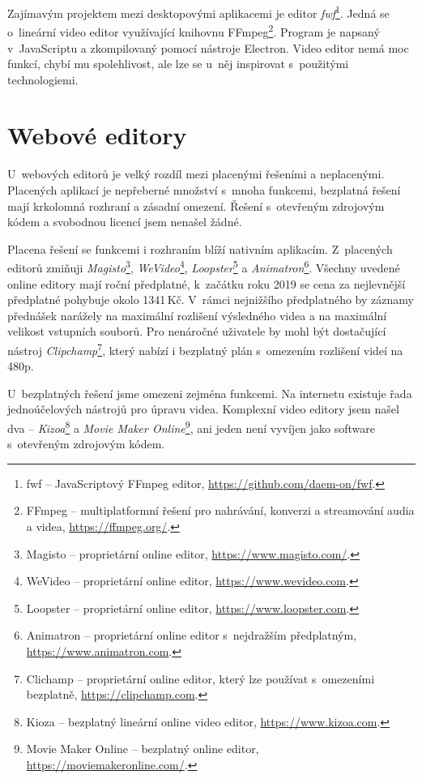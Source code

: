 Zajímavým projektem mezi desktopovými aplikacemi je editor \textit{fwf}\footnote{fwf -- JavaScriptový FFmpeg editor, \url{https://github.com/daem-on/fwf}.}. Jedná se o~lineární video editor využívající knihovnu FFmpeg\footnote{FFmpeg -- multiplatformní řešení pro nahrávání, konverzi a streamování audia a videa, \url{https://ffmpeg.org/}.}. Program je napsaný v~JavaScriptu a zkompilovaný pomocí nástroje Electron. Video editor nemá moc funkcí, chybí mu spolehlivost, ale lze se u~něj inspirovat s~použitými technologiemi.

\section{Webové editory}
U~webových editorů je velký rozdíl mezi placenými řešeními a neplacenými. Placených aplikací je nepřeberné množství s~mnoha funkcemi, bezplatná řešení mají krkolomná rozhraní a zásadní omezení. Řešení s~otevřeným zdrojovým kódem a svobodnou licencí jsem nenašel žádné.

Placena řešení se funkcemi i rozhraním blíží nativním aplikacím. Z~placených editorů zmiňuji \textit{Magisto}\footnote{Magisto -- proprietární online editor, \url{https://www.magisto.com/}.}, \textit{WeVideo}\footnote{WeVideo --  proprietární online editor, \url{https://www.wevideo.com}.}, \textit{Loopster}\footnote{Loopster -- proprietární online editor, \url{https://www.loopster.com}.} a \textit{Animatron}\footnote{Animatron -- proprietární online editor s~nejdražším předplatným, \url{https://www.animatron.com}.}. Všechny uvedené online editory mají roční předplatné, k~začátku roku 2019 se cena za nejlevnější předplatné pohybuje okolo 1341\,Kč. V~rámci nejnižšího předplatného by záznamy přednášek narážely na  maximální rozlišení výsledného videa a na maximální velikost vstupních souborů. Pro nenáročné uživatele by mohl být dostačující nástroj \textit{Clipchamp}\footnote{Clichamp -- proprietární online editor, který lze používat s~omezeními bezplatně, \url{https://clipchamp.com}.}, který nabízí i bezplatný plán s~omezením rozlišení videí na 480p.

U~bezplatných řešení jsme omezeni zejména funkcemi. Na internetu existuje řada jednoúčelových nástrojů pro úpravu videa. Komplexní video editory jsem našel dva -- \textit{Kizoa}\footnote{Kioza -- bezplatný lineární online video editor, \url{https://www.kizoa.com}.} a \textit{Movie Maker Online}\footnote{Movie Maker Online -- bezplatný online editor, \url{https://moviemakeronline.com/}.}, ani jeden není vyvíjen jako software s~otevřeným zdrojovým kódem.

